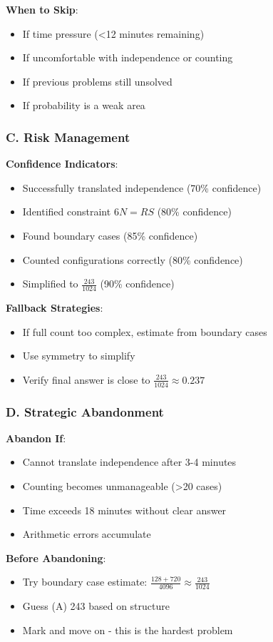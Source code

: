 \documentclass[12pt]{article}
\begin{document}
\begin{competitionbox}
\textbf{When to Skip}:
\begin{itemize}
    \item If time pressure (<12 minutes remaining)
    \item If uncomfortable with independence or counting
    \item If previous problems still unsolved
    \item If probability is a weak area
\end{itemize}

\subsubsection*{C. Risk Management}

\textbf{Confidence Indicators}:
\begin{itemize}
    \item Successfully translated independence (70\% confidence)
    \item Identified constraint $6N = RS$ (80\% confidence)
    \item Found boundary cases (85\% confidence)
    \item Counted configurations correctly (80\% confidence)
    \item Simplified to $\frac{243}{1024}$ (90\% confidence)
\end{itemize}

\textbf{Fallback Strategies}:
\begin{itemize}
    \item If full count too complex, estimate from boundary cases
    \item Use symmetry to simplify
    \item Verify final answer is close to $\frac{243}{1024} \approx 0.237$
\end{itemize}

\subsubsection*{D. Strategic Abandonment}

\textbf{Abandon If}:
\begin{itemize}
    \item Cannot translate independence after 3-4 minutes
    \item Counting becomes unmanageable (>20 cases)
    \item Time exceeds 18 minutes without clear answer
    \item Arithmetic errors accumulate
\end{itemize}

\textbf{Before Abandoning}:
\begin{itemize}
    \item Try boundary case estimate: $\frac{128 + 720}{4096} \approx \frac{243}{1024}$
    \item Guess (A) 243 based on structure
    \item Mark and move on - this is the hardest problem
\end{itemize}

\end{competitionbox}
\end{document}
